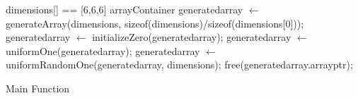 \documentclass[10pt,twocolumn]{witseiepaper}
\begin{document}
\begin{appendix}
\begin{algorithm}[htbp]
	\begin{algorithmic}
		\State dimensions[] == [6,6,6]
		\State arrayContainer generated\textunderscore array $\leftarrow$ generateArray(dimensions, sizeof(dimensions)/sizeof(dimensions[0]));
		\State generated\textunderscore array $\leftarrow$ initializeZero(generated\textunderscore array);
		\State generated\textunderscore array $\leftarrow$ uniformOne(generated\textunderscore array);
		\State generated\textunderscore array $\leftarrow$ uniformRandomOne(generated\textunderscore array, dimensions);
		\State free(generated\textunderscore array.array\textunderscore ptr);
		\EndFunction
		\caption{Main Function}
		\label{alg:4}
	\end{algorithmic}
\end{algorithm}

\end{appendix}
\end{document}
